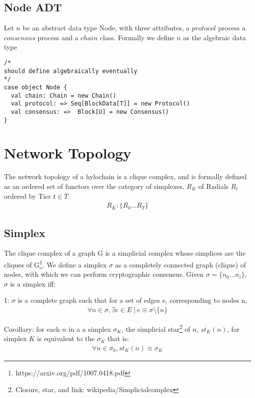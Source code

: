 \documentclass{article}
\begin{document}
\subsection{Node ADT}
Let $n$ be an abstract data type Node, with three attributes, a $protocol$ process a $consensus$ process and a $chain$ class. Formally we define $n$ as the algebraic data type
\begin{lstlisting}
/*
should define algebraically eventually
*/
case object Node {
  val chain: Chain = new Chain()
  val protocol: => Seq[BlockData[T]] = new Protocol()
  val consensus: =>  Block[U] = new Consensus()
}
\end{lstlisting}

\section{Network Topology}
The network topology of a hylochain is a clique complex, and is formally defined as an ordered set of functors over the category of simplexes, $R_K$ of Radials $R_t$ ordered by Tier $t \in T$
\begin{equation} \label{eq1}
\begin{split}
R_K: \{R_0 \dots R_T \}
\end{split}
\end{equation}

\subsection{Simplex}
The clique complex of a graph G is a simplicial complex whose simplices are the cliques of G\footnote{https://arxiv.org/pdf/1007.0418.pdf}. We define a simplex $\sigma$ as a completely connected graph (clique) of nodes, with which we can perform cryptographic consensus. Given $\sigma = \{n_0 \dots n_i\}$, $\sigma$ is a simplex iff:

1: $\sigma$ is a complete graph such that for a set of edges e, corresponding to nodes n,
\begin{equation} \label{eq1}
\begin{split}
\forall n \in \sigma, \exists e \in E \ | \ e \equiv \sigma \setminus \{n\} 
\end{split}
\end{equation}

Corollary: for each $n$ in a a simplex $\sigma_K$, the simplicial star\footnote{Closure, star, and link: wikipedia/Simplicialcomplex} of $n$, $st_K(n)$, for simplex $K$ is equivalent to the $\sigma_K$ that is:
\begin{equation} \label{eq1}
\begin{split}
\forall n \in \sigma_k, st_K(n) \equiv \sigma_K
\end{split}
\end{equation}
\end{document}
